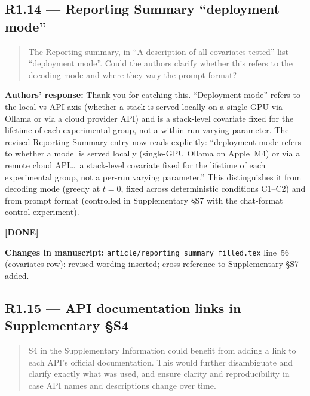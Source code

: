 \documentclass[11pt,a4paper]{article}
\newenvironment{revquote}{%
  \begin{quote}\small\itshape\color{revgray}
}{%
  \end{quote}
}
\newcommand{\response}[1]{\par\noindent\textbf{\color{revgreen}Authors' response:} #1\par}
\newcommand{\changes}[1]{\par\noindent\textbf{\color{revblue}Changes in manuscript:} #1\par}
\newcommand{\done}{\color{revgreen}\textbf{[DONE]}}
\begin{document}
\subsection*{R1.14 --- Reporting Summary ``deployment mode''}

\begin{revquote}
The Reporting summary, in ``A description of all covariates tested'' list ``deployment mode''. Could the authors clarify whether this refers to the decoding mode and where they vary the prompt format?
\end{revquote}

\response{Thank you for catching this. ``Deployment mode'' refers to the local-vs-API axis (whether a stack is served locally on a single GPU via Ollama or via a cloud provider API) and is a stack-level covariate fixed for the lifetime of each experimental group, not a within-run varying parameter. The revised Reporting Summary entry now reads explicitly: ``deployment mode refers to whether a model is served locally (single-GPU Ollama on Apple~M4) or via a remote cloud API\ldots\ a stack-level covariate fixed for the lifetime of each experimental group, not a per-run varying parameter.'' This distinguishes it from decoding mode (greedy at $t=0$, fixed across deterministic conditions C1--C2) and from prompt format (controlled in Supplementary §S7 with the chat-format control experiment).} \done

\changes{\texttt{article/reporting\_summary\_filled.tex} line~56 (covariates row): revised wording inserted; cross-reference to Supplementary §S7 added.}

\subsection*{R1.15 --- API documentation links in Supplementary §S4}

\begin{revquote}
S4 in the Supplementary Information could benefit from adding a link to each API's official documentation. This would further disambiguate and clarify exactly what was used, and ensure clarity and reproducibility in case API names and descriptions change over time.
\end{revquote}
\end{document}
